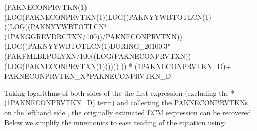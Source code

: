 \documentclass[letterpaper,10pt,english]{jupyterBook}
\begin{document}
\sphinxAtStartPar
(PAKNECONPRVTKN(\sphinxhyphen{}1)(LOG(PAKNECONPRVTKN(\sphinxhyphen{}1))\sphinxhyphen{}LOG((PAKNYYWBTOTLCN(\sphinxhyphen{}1)((LOG((PAKNYYWBTOTLCN*(1\sphinxhyphen{}PAKGGREVDRCTXN/100))/PAKNECONPRVTXN))\sphinxhyphen{}(LOG((PAKNYYWBTOTLCN(\sphinxhyphen{}1)DURING\_2010\sphinxhyphen{}0.3*(PAKFMLBLPOLYXN/100\sphinxhyphen{}((LOG(PAKNECONPRVTXN))\sphinxhyphen{}(LOG(PAKNECONPRVTXN(\sphinxhyphen{}1)))))) )) * (1\sphinxhyphen{}PAKNECONPRVTKN\_D)+ PAKNECONPRVTKN\_X*PAKNECONPRVTKN\_D

\sphinxAtStartPar
Taking logarithms of both sides of the the first expression (excluding the *(1\sphinxhyphen{}PAKNECONPRVTKN\_D) term) and collecting the PAKNECONPRVTKNs on the left\sphinxhyphen{}hand side , the originally estimated ECM expression can be recovered. Below we simplify the mnemonics to ease reading of the equation using:
\end{document}
